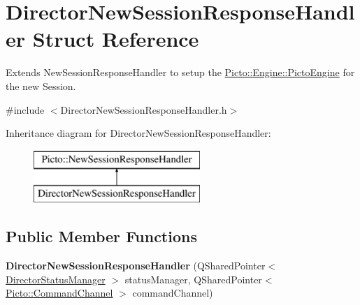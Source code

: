 \hypertarget{struct_director_new_session_response_handler}{\section{Director\-New\-Session\-Response\-Handler Struct Reference}
\label{struct_director_new_session_response_handler}
}


Extends New\-Session\-Response\-Handler to setup the \hyperlink{class_picto_1_1_engine_1_1_picto_engine}{Picto\-::\-Engine\-::\-Picto\-Engine} for the new Session.  




{\ttfamily \#include $<$Director\-New\-Session\-Response\-Handler.\-h$>$}

Inheritance diagram for Director\-New\-Session\-Response\-Handler\-:\begin{figure}[H]
\begin{center}
\leavevmode
\includegraphics[height=2.000000cm]{struct_director_new_session_response_handler}
\end{center}
\end{figure}
\subsection*{Public Member Functions}
\begin{DoxyCompactItemize}
\item 
\hypertarget{struct_director_new_session_response_handler_a40a862711c249b2f0aa1d05823992bdc}{{\bfseries Director\-New\-Session\-Response\-Handler} (Q\-Shared\-Pointer$<$ \hyperlink{class_director_status_manager}{Director\-Status\-Manager} $>$ status\-Manager, Q\-Shared\-Pointer$<$ \hyperlink{class_picto_1_1_command_channel}{Picto\-::\-Command\-Channel} $>$ command\-Channel)}\label{struct_director_new_session_response_handler_a40a862711c249b2f0aa1d05823992bdc}

\end{DoxyCompactItemize}

